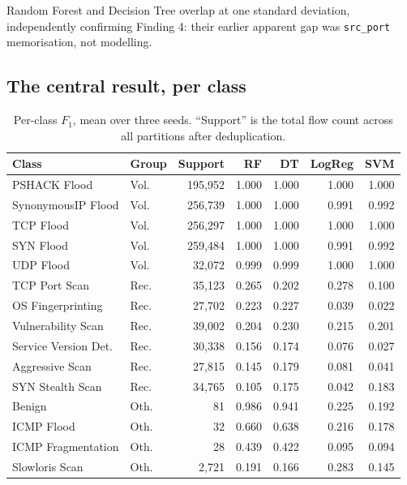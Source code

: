 \documentclass[11pt, a4paper]{article}
\newcommand{\col}[1]{\texttt{\small #1}}
\begin{document}
\noindent
Random Forest and Decision Tree overlap at one standard deviation, independently
confirming Finding 4: their earlier apparent gap was \col{src\_port}
memorisation, not modelling.

\subsection{The central result, per class}

\begin{table}[h]
\centering
\caption{Per-class $F_1$, mean over three seeds. ``Support'' is the total flow
         count across all partitions after deduplication.}
\small
\begin{tabular}{llrrrrr}
\toprule
\textbf{Class} & \textbf{Group} & \textbf{Support} & \textbf{RF} & \textbf{DT} & \textbf{LogReg} & \textbf{SVM} \\
\midrule
PSHACK Flood        & Vol. & 195{,}952 & 1.000 & 1.000 & 1.000 & 1.000 \\
SynonymousIP Flood  & Vol. & 256{,}739 & 1.000 & 1.000 & 0.991 & 0.992 \\
TCP Flood           & Vol. & 256{,}297 & 1.000 & 1.000 & 1.000 & 1.000 \\
SYN Flood           & Vol. & 259{,}484 & 1.000 & 1.000 & 0.991 & 0.992 \\
UDP Flood           & Vol. & 32{,}072  & 0.999 & 0.999 & 1.000 & 1.000 \\
\midrule
TCP Port Scan       & Rec. & 35{,}123 & 0.265 & 0.202 & 0.278 & 0.100 \\
OS Fingerprinting   & Rec. & 27{,}702 & 0.223 & 0.227 & 0.039 & 0.022 \\
Vulnerability Scan  & Rec. & 39{,}002 & 0.204 & 0.230 & 0.215 & 0.201 \\
Service Version Det.& Rec. & 30{,}338 & 0.156 & 0.174 & 0.076 & 0.027 \\
Aggressive Scan     & Rec. & 27{,}815 & 0.145 & 0.179 & 0.081 & 0.041 \\
SYN Stealth Scan    & Rec. & 34{,}765 & 0.105 & 0.175 & 0.042 & 0.183 \\
\midrule
Benign              & Oth. & 81    & 0.986 & 0.941 & 0.225 & 0.192 \\
ICMP Flood          & Oth. & 32    & 0.660 & 0.638 & 0.216 & 0.178 \\
ICMP Fragmentation  & Oth. & 28    & 0.439 & 0.422 & 0.095 & 0.094 \\
Slowloris Scan      & Oth. & 2{,}721 & 0.191 & 0.166 & 0.283 & 0.145 \\
\bottomrule
\end{tabular}
\end{table}
\end{document}
